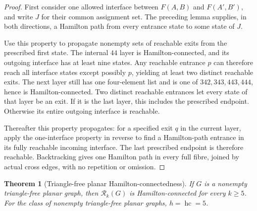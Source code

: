 \documentclass[11pt]{article}
\newtheorem{theorem}{Theorem}[section]
\theoremstyle{remark}
\newcommand{\Rk}{\mathcal R_k}
\newcommand{\hc}{\operatorname{hc}}
\numberwithin{equation}{section}
\numberwithin{table}{section}
\begin{document}
\begin{proof}
First consider one allowed interface between $F(A,B)$ and $F(A',B')$,
and write $J$ for their common assignment set.  The preceding lemma
supplies, in both directions, a Hamilton path from every entrance state
to some state of $J$.

Use this property to propagate nonempty sets of reachable exits from
the prescribed first state.  The internal $44$ layer is
Hamilton-connected, and its outgoing interface has at least nine states.
Any reachable entrance $p$ can therefore reach all interface states
except possibly $p$, yielding at least two distinct reachable exits.
The next layer still has one four-element list and is one of
$342,343,443,444$, hence is Hamilton-connected.  Two distinct reachable
entrances let every state of that layer be an exit.  If it is the last
layer, this includes the prescribed endpoint.  Otherwise its entire
outgoing interface is reachable.

Thereafter this property propagates: for a specified exit $q$ in the
current layer, apply the one-interface property in reverse to find a
Hamilton-path entrance in its fully reachable incoming interface.
The last prescribed endpoint is therefore reachable.  Backtracking
gives one Hamilton path in every full fibre, joined by actual cross
edges, with no repetition or omission.
\end{proof}

\begin{theorem}[Triangle-free planar Hamilton-connectedness]
\label{thm:trianglefree-hc}
If $G$ is a nonempty triangle-free planar graph, then $\Rk(G)$ is
Hamilton-connected for every $k\ge5$.  For the class of nonempty
triangle-free planar graphs,
$h=\hc=5$.
\end{theorem}
\end{document}
